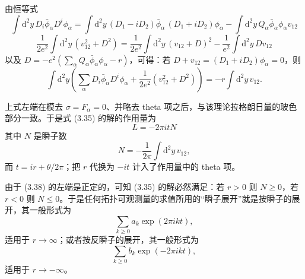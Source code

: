 由恒等式
\begin{equation}
\int \mathrm{d}^2y\,D_i\bar\phi_\alpha D^i\phi_\alpha
= \int \mathrm{d}^2y\,(D_1-iD_2)\bar\phi_\alpha\,(D_1+iD_2)\phi_\alpha
- \int \mathrm{d}^2y\,Q_\alpha\bar\phi_\alpha\phi_\alpha v_{12}
\tag{3.36}
\end{equation}
\begin{equation}
\frac{1}{2e^2}\int \mathrm{d}^2y\,(v_{12}^2+D^2)
= \frac{1}{2e^2}\int \mathrm{d}^2y\,(v_{12}+D)^2
- \frac{1}{e^2}\int \mathrm{d}^2y\,D v_{12}
\tag{3.37}
\end{equation}
以及 $D=-e^2\left(\sum_\alpha Q_\alpha\bar\phi_\alpha\phi_\alpha-r\right)$，可得：若 $D+v_{12}=(D_1+iD_2)\phi_\alpha=0$，则
\begin{equation}
\int \mathrm{d}^2y\left(\sum_\alpha D_i\bar\phi_\alpha D^i\phi_\alpha
+ \frac{1}{2e^2}(v_{12}^2+D^2)\right)
= -r\int \mathrm{d}^2y\, v_{12}.
\tag{3.38}
\end{equation}

上式左端在模去 $\sigma=F_\alpha=0$、并略去 theta 项之后，与该理论拉格朗日量的玻色部分一致。于是式 (3.35) 的解的作用量为
\begin{equation}
L=-2\pi i tN
\tag{3.39}
\end{equation}
其中 $N$ 是瞬子数
\begin{equation}
N=-\frac{1}{2\pi}\int \mathrm{d}^2y\, v_{12},
\tag{3.40}
\end{equation}
而 $t=ir+\theta/2\pi$；把 $r$ 代换为 $-it$ 计入了作用量中的 theta 项。

\label{op:38}
由于 (3.38) 的左端是正定的，可知 (3.35) 的解必然满足：若 $r>0$ 则 $N\ge0$，若 $r<0$ 则 $N\le0$。于是任何拓扑可观测量的求值所用的“瞬子展开”就是按瞬子的展开，其一般形式为
\begin{equation}
\sum_{k\ge0}a_k\exp(2\pi ikt),
\tag{3.41}
\end{equation}
适用于 $r\to\infty$；或者按反瞬子的展开，其一般形式为
\begin{equation}
\sum_{k\ge0}b_k\exp(-2\pi ikt),
\tag{3.42}
\end{equation}
适用于 $r\to-\infty$。

